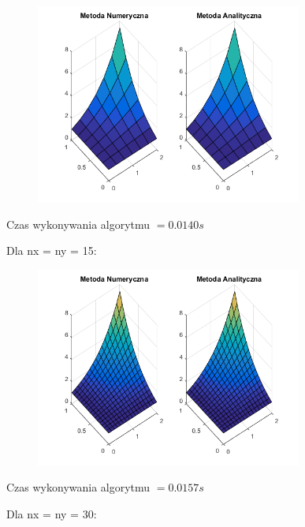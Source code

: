 \begin{figure}[!ht]
	\begin{center}
		\includegraphics[width=0.78\textwidth]{Lab5/charts/zad2/5x5.png}
	\end{center}
\end{figure}

Czas wykonywania algorytmu $ = 0.0140 s$

Dla nx = ny = 15:

\begin{figure}[!ht]
	\begin{center}
		\includegraphics[width=0.78\textwidth]{Lab5/charts/zad2/15x15.png}
	\end{center}
\end{figure}

Czas wykonywania algorytmu $ = 0.0157 s$

\newpage
Dla nx = ny = 30:

